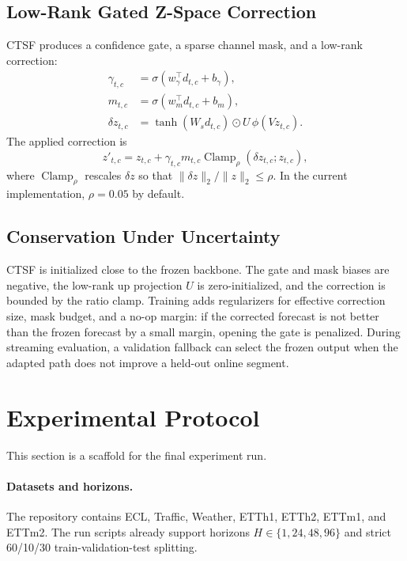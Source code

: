 \documentclass[10pt]{article}
\begin{document}
\subsection{Low-Rank Gated Z-Space Correction}
CTSF produces a confidence gate, a sparse channel mask, and a low-rank correction:
\begin{align}
    \gamma_{t,c} &= \sigma(w_{\gamma}^{\top} d_{t,c} + b_{\gamma}),\\
    m_{t,c} &= \sigma(w_m^{\top} d_{t,c} + b_m),\\
    \delta z_{t,c} &= \tanh(W_s d_{t,c}) \odot U\,\phi(V z_{t,c}).
\end{align}
The applied correction is
\begin{equation}
    z'_{t,c} =
    z_{t,c} +
    \gamma_{t,c} m_{t,c}
    \operatorname{Clamp}_{\rho}( \delta z_{t,c}; z_{t,c}),
\end{equation}
where $\operatorname{Clamp}_{\rho}$ rescales $\delta z$ so that
$\|\delta z\|_2 / \|z\|_2 \leq \rho$. In the current implementation, $\rho=0.05$ by default.

\subsection{Conservation Under Uncertainty}
CTSF is initialized close to the frozen backbone. The gate and mask biases are negative, the low-rank up projection $U$ is zero-initialized, and the correction is bounded by the ratio clamp. Training adds regularizers for effective correction size, mask budget, and a no-op margin: if the corrected forecast is not better than the frozen forecast by a small margin, opening the gate is penalized. During streaming evaluation, a validation fallback can select the frozen output when the adapted path does not improve a held-out online segment.

\section{Experimental Protocol}
This section is a scaffold for the final experiment run.

\paragraph{Datasets and horizons.}
The repository contains ECL, Traffic, Weather, ETTh1, ETTh2, ETTm1, and ETTm2. The run scripts already support horizons $H \in \{1,24,48,96\}$ and strict 60/10/30 train-validation-test splitting.
\end{document}
